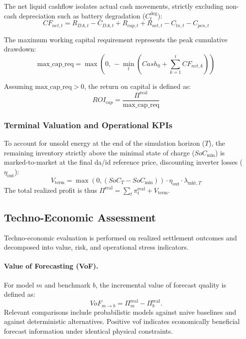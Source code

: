The net liquid cashflow isolates actual cash movements, strictly excluding non-cash depreciation such as battery degradation ($C^{\mathrm{deg}}_t$):
\begin{equation}
    CF_{net,t} = R_{DA,t} - C_{DA,t} + R_{cap,t} + R_{act,t} - C_{tx,t} - C_{pen,t}
\end{equation}

The maximum working capital requirement represents the peak cumulative drawdown:
\begin{equation}
    \text{max\_cap\_req} = \max\left(0,\,-\min_t \left(Cash_0 + \sum_{k=1}^{t} CF_{net,k} \right)\right)
\end{equation}

Assuming $\text{max\_cap\_req} > 0$, the return on capital is defined as:
\begin{equation}
    ROI_{cap} = \frac{\Pi^{\mathrm{real}}}{\text{max\_cap\_req}}
\end{equation}

\subsubsection{Terminal Valuation and Operational KPIs}
To account for unsold energy at the end of the simulation horizon ($T$), the remaining inventory strictly above the minimal state of charge ($SoC_{\min}$) is marked-to-market at the final \gls{da}/\gls{id} reference price, discounting inverter losses ($\eta_{\text{out}}$):
\begin{equation}
    V_{\mathrm{term}} = \max(0, (SoC_T - SoC_{\min})) \cdot \eta_{\text{out}} \cdot \lambda_{\text{mkt},T}
\end{equation}
The total realized profit is thus $\Pi^{\mathrm{real}} = \sum_t \pi^{\mathrm{real}}_t + V_{\mathrm{term}}$.


\subsection{Techno-Economic Assessment}
\label{subsec:techno-economic-assessment}
Techno-economic evaluation is performed on realized settlement outcomes and decomposed into value, risk, and operational stress indicators.

\paragraph{Value of Forecasting (VoF).}
For model $m$ and benchmark $b$, the incremental value of forecast quality is defined as:
\begin{equation}\label{eq:vof}
    VoF_{m\to b} = \Pi^{\mathrm{real}}_{m} - \Pi^{\mathrm{real}}_{b}.
\end{equation}
Relevant comparisons include probabilistic models against naive baselines and against deterministic alternatives. Positive \gls{vof} indicates economically beneficial forecast information under identical physical constraints.

